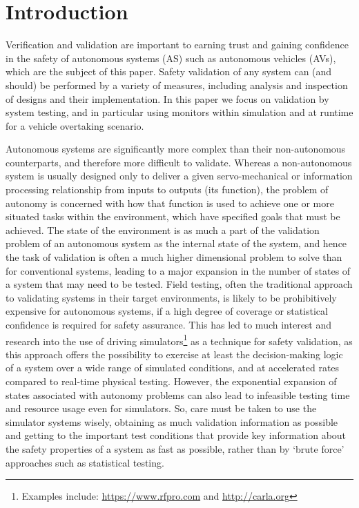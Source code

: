 \section{Introduction}

Verification and validation are important to earning trust and gaining confidence in the safety of autonomous systems (AS) such as autonomous vehicles (AVs), which are the subject of this paper. Safety validation of any system can (and should) be performed by a variety of measures, including analysis and inspection of designs and their implementation. In this paper we focus on validation by system testing, and in particular using monitors within simulation and at runtime for a vehicle overtaking scenario. 
%


Autonomous systems are significantly more complex than their non-autonomous counterparts, and therefore more difficult to validate. Whereas a non-autonomous system is usually designed only to deliver a given servo-mechanical or information processing relationship from inputs to outputs (its function), the problem of autonomy is concerned with how that function is used to achieve one or more situated tasks within the environment, which have specified goals that must be achieved. The state of the environment is as much a part of the validation problem of an autonomous system as the internal state of the system, and hence the task of validation is often a much higher dimensional problem to solve than for conventional systems, leading to a major expansion in the number of states of a system that may need to be tested. Field testing, often the traditional approach to validating systems in their target environments, is likely to be prohibitively expensive for autonomous systems, if a high degree of coverage or statistical confidence is required for safety assurance. This has led to much interest and research into the use of driving simulators\footnote{Examples include: \url{https://www.rfpro.com} and \url{http://carla.org}} as a technique for safety validation, as this approach offers the possibility to exercise at least the decision-making logic of a system over a wide range of simulated conditions, and at accelerated rates compared to real-time physical testing. However, the exponential expansion of states associated with autonomy problems can also lead to infeasible testing time and resource usage even for simulators. So, care must be taken to use the simulator systems wisely, obtaining as much validation information as possible and getting to the important test conditions that provide key information about the safety properties of a system as fast as possible, rather than by `brute force' approaches such as statistical testing.

